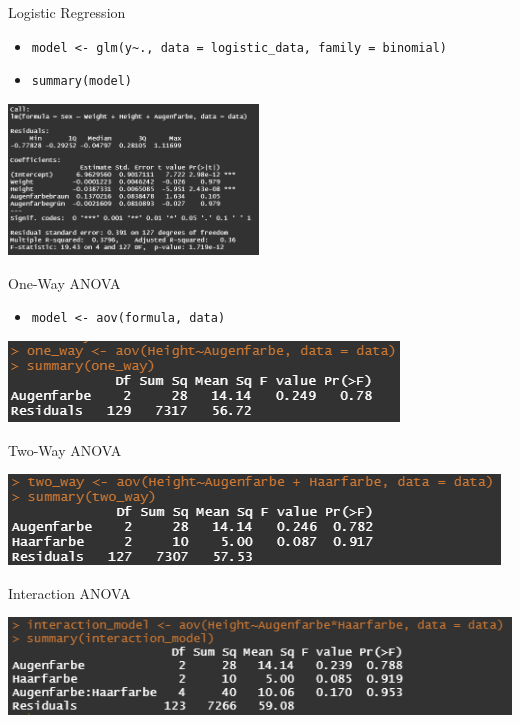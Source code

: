 \documentclass[xcolor=dvipsnames, aspectratio = 169]{beamer}
\begin{document}
\begin{frame}[fragile]{Logistic Regression}
	\begin{itemize}
		\item \verb+model <- glm(y~., data = logistic_data, family = binomial)+
		\item \verb+summary(model)+
	\end{itemize}
			
	\begin{center}
		\includegraphics[height=4cm]{LogisticRegressionSummary}
	\end{center}
\end{frame}

\begin{frame}[fragile]{One-Way ANOVA}
	\begin{itemize}
		\item \verb+model <- aov(formula, data)+
	\end{itemize}	
	\begin{center}
		\includegraphics{OneWay}
	\end{center}
\end{frame}

\begin{frame}[fragile]{Two-Way ANOVA}
	\begin{center}
		\includegraphics{TwoWay}
	\end{center}
\end{frame}

\begin{frame}[fragile]{Interaction ANOVA}
	\begin{center}
		\includegraphics{Interaction}
	\end{center}
\end{frame}
\end{document}
